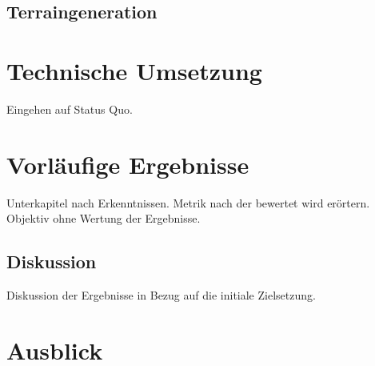 \documentclass{article}
\begin{document}
		\subsection{Terraingeneration}
		
	\section{Technische Umsetzung}
	Eingehen auf Status Quo.
	
	\section{Vorläufige Ergebnisse}
	Unterkapitel nach Erkenntnissen. Metrik nach der bewertet wird erörtern. Objektiv ohne Wertung der Ergebnisse.
	
		\subsection{Diskussion}
		Diskussion der Ergebnisse in Bezug auf die initiale Zielsetzung.
	
	\section{Ausblick}
	
	
\end{document}
